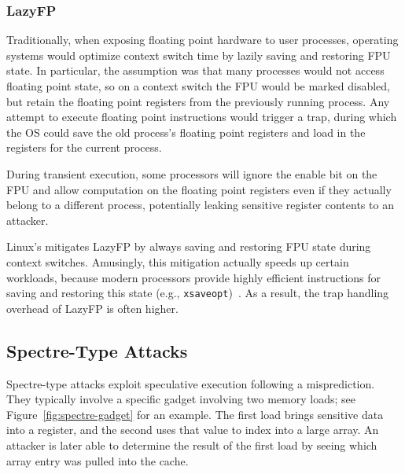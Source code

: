 \subsubsection{LazyFP}
Traditionally, when exposing floating point hardware to user processes, operating systems would optimize context switch time by lazily saving and restoring FPU state.
In particular, the assumption was that many processes would not access floating point state, so on a context switch the FPU would be marked disabled, but retain the floating point registers from the previously running process.
Any attempt to execute floating point instructions would trigger a trap, during which the OS could save the old process's floating point registers and load in the registers for the current process.

During transient execution, some processors will ignore the enable bit on the FPU and allow computation on the floating point registers even if they actually belong to a different process, potentially leaking sensitive register contents to an attacker.

Linux's mitigates LazyFP by always saving and restoring FPU state during context
switches.  Amusingly, this mitigation actually speeds up certain workloads,
because modern processors provide highly efficient instructions for saving and
restoring this state (e.g., \texttt{xsaveopt})~\cite{lutomirski:lazyfp-perf}. As
a result, the trap handling overhead of LazyFP is often higher.


\subsection{Spectre-Type Attacks}

Spectre-type attacks exploit speculative execution following a misprediction.
They typically involve a specific gadget involving two memory loads; see Figure~\ref{fig:spectre-gadget} for an example.
The first load brings sensitive data into a register, and the second uses that value to index into a large array.
An attacker is later able to determine the result of the first load by seeing which array entry was pulled into the cache.

